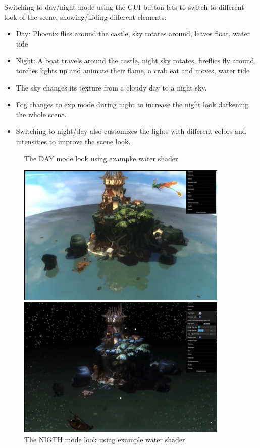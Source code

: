 \documentclass[10pt,a4paper]{article}
\begin{document}
Switching to day/night mode using the GUI button lets to switch to different look of the scene, showing/hiding different elements:

\begin{itemize}
 \item Day: Phoenix flies around  the castle, sky rotates around, leaves float,  water tide
 \item Night: A boat travels around the castle, night sky rotates, fireflies fly around, torches lights up and animate their flame, a crab eat and moves, water tide
\end{itemize}

\begin{itemize}
 \item The sky changes its texture from a cloudy day to a night sky.
 \item Fog changes to exp mode during night to increase the night look darkening the whole scene.
 \item Switching to night/day also customizes the lights with different colors and intensities to improve the scene look.
 \end{itemize}
 
\begin{figure}[H]
\centering
\caption{The DAY mode look using exampke water shader}
\includegraphics[width=0.9\textwidth,keepaspectratio]{day}
\caption{The NIGTH mode look using example water shader}
\includegraphics[width=0.9\textwidth,keepaspectratio]{night}
\end{figure}
\end{document}
